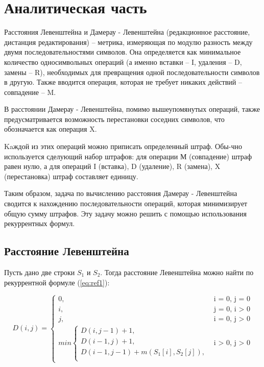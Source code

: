 \chapter{Аналитическая часть}

Расстояния Левенштейна и Дамерау - Левенштейна (редакционное расстояние, дистанция редактирования) -- метрика, измеряющая по модулю разность между двумя последовательностями символов. 
Она определяется как минимальное количество односимвольных операций (а именно вставки -- I, удаления -- D, замены -- R), необходимых для превращения одной последовательности символов в другую. 
Также вводится операция, которая не требует никаких действий -- совпадение -- M.

В расстоянии Дамерау - Левенштейна, помимо вышеупомянутых операций, также предусматривается возможность перестановки соседних символов, что обозначается как операция X.

Kaждой из этих операций можно приписать определенный штраф.
Обы-чно используется сделующий набор штрафов: для операции М (совпадение) штраф равен нулю, а для операций I (вставка), D (удаление), R (замена), X (перестановка) штраф составляет единицу.

Таким образом, задача по вычислению расстояния Дамерау - Левенштейна сводится к нахождению последовательности операций, которая минимизирует общую сумму штрафов. 
Эту задачу можно решить с помощью использования рекуррентных формул.

\section{Расстояние Левенштейна}

Пусть дано две строки $S_{1}$ и $S_{2}$. Тогда расстояние Левенштейна можно найти по рекуррентной формуле (\ref{eq:ref1}):

\begin{equation}
	\label{eq:ref1}
	D(i, j) =
	\begin{cases}
		0, &\text{i = 0, j = 0}\\
		i, &\text{j = 0, i > 0}\\
		j, &\text{i = 0, j > 0}\\
		min \begin{cases}
			D(i, j - 1) + 1,\\
			D(i - 1, j) + 1,\\
			D(i - 1, j - 1) +  m(S_{1}[i], S_{2}[j]), \\
		\end{cases}
		&\text{i > 0, j > 0}
	\end{cases}
\end{equation}

